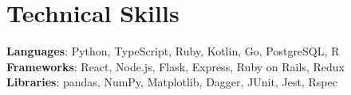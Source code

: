 \documentclass[letterpaper,11pt]{article}
\begin{document}
%
\section{Technical Skills}
 \begin{itemize}[leftmargin=0.15in, label={}]
    \small{\item{
    \textbf{Languages}{: Python, TypeScript, Ruby, Kotlin, Go, PostgreSQL, R} \\
     \textbf{Frameworks}{: React, Node.js, Flask, Express, Ruby on Rails, Redux} \\
     \textbf{Libraries}{: pandas, NumPy, Matplotlib, Dagger, JUnit, Jest, Rspec}
    }}
 \end{itemize}


\end{document}
